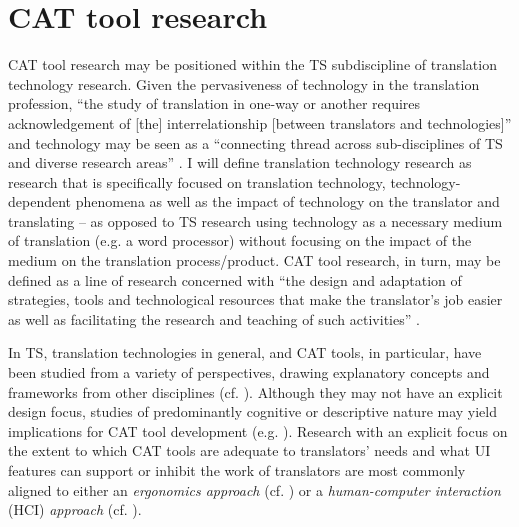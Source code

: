 \section{CAT tool research}

CAT tool research may be positioned within the TS subdiscipline of translation technology research. Given the pervasiveness of technology in the translation profession, ``the study of translation in one-way or another requires acknowledgement of [the] interrelationship [between translators and technologies]'' \citep[2]{jimenez2020technological} and technology may be seen as a ``connecting thread across sub-disciplines of TS and diverse research areas'' \citep[3]{jimenez2020technological}. I will define translation technology research as research that is specifically focused on translation technology, technology-dependent phenomena as well as the impact of technology on the translator and translating -- as opposed to TS research using technology as a necessary medium of translation (e.g. a word processor) without focusing on the impact of the medium on the translation process/product. CAT tool research, in turn, may be defined as a line of research concerned with ``the design and adaptation of strategies, tools and technological resources that make the translator’s job easier as well as facilitating the research and teaching of such activities'' \citep[90]{alcina2008translation}.

In TS, translation technologies in general, and CAT tools, in particular, have been studied from a variety of perspectives, drawing explanatory concepts and frameworks from other disciplines (cf. \citealt{olohan2019technology}). Although they may not have an explicit design focus, studies of predominantly cognitive or descriptive nature may yield implications for CAT tool development (e.g. \cite{mellinger2016match}). Research with an explicit focus on the extent to which CAT tools are adequate to translators’ needs and what UI features can support or inhibit the work of translators are most commonly aligned to either an \textit{ergonomics approach} (cf. \cite{ehrensberger2019ergonomics}) or a \textit{human-computer interaction} (HCI) \textit{approach} (cf. \cite{laubli2019translation}).

